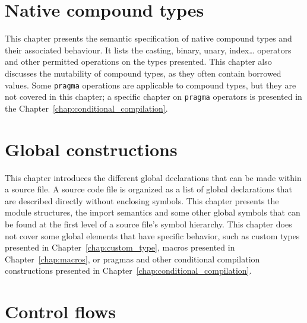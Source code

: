 \documentclass[a4paper,11pt]{book}
\begin{document}
\chapter{Native compound types}
\label{chap:compound}
This chapter presents the semantic specification of native compound types and
their associated behaviour. It lists the casting, binary, unary, index\ldots
operators and other permitted operations on the types presented. This chapter
also discusses the mutability of compound types, as they often contain borrowed
values. Some \texttt{pragma} operations are applicable to compound types, but
they are not covered in this chapter; a specific chapter on \texttt{pragma}
operators is presented in the Chapter~\ref{chap:conditional_compilation}.

\begin{multicols*}{2}
  \minitoc%
  
\end{multicols*}

\chapter{Global constructions}%
\label{chap:global_construction}

This chapter introduces the different global declarations that can be made
within a source file. A source code file is organized as a list of global
declarations that are described directly without enclosing symbols. This chapter
presents the module structures, the import semantics and some other global
symbols that can be found at the first level of a source file's symbol
hierarchy. This chapter does not cover some global elements that have specific
behavior, such as custom types presented in Chapter~\ref{chap:custom_type},
macros presented in Chapter~\ref{chap:macros}, or pragmas and other conditional
compilation constructions presented in
Chapter~\ref{chap:conditional_compilation}.

\begin{multicols*}{2}
  \minitoc%
  
\end{multicols*}

\chapter{Control flows}%
\label{chap:control_flows}
\end{document}

